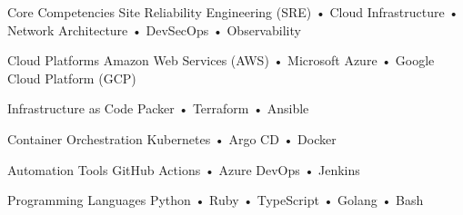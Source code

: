 

\begin{cvskills}

  \cvskill
    {Core Competencies} %
    {Site Reliability Engineering (SRE) • Cloud Infrastructure • Network Architecture • DevSecOps • Observability} %

  \cvskill
    {Cloud Platforms} %
    {Amazon Web Services (AWS) • Microsoft Azure • Google Cloud Platform (GCP)} %

  \cvskill
    {Infrastructure as Code} %
    {Packer • Terraform • Ansible} %

  \cvskill
    {Container Orchestration} %
    {Kubernetes • Argo CD • Docker} %

  \cvskill
    {Automation Tools} %
    {GitHub Actions • Azure DevOps • Jenkins} %

  \cvskill
    {Programming Languages} %
    {Python • Ruby • TypeScript • Golang • Bash} %

\end{cvskills}
